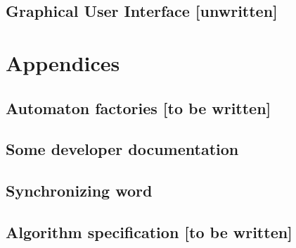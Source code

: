 \chapter{Graphical User Interface [unwritten]}

\part{Appendices}
\begin{appendices}
\chapter{Automaton factories [to be written]}

\chapter{Some developer documentation}


\chapter{Synchronizing word}


\chapter{Algorithm specification [to be written]}

\end{appendices}


\backmatter

\cleardoublepage

%

\cleardoublepage
\printindex


